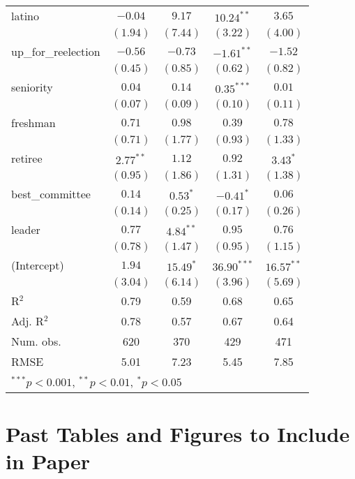 \documentclass[12pt]{article}
\begin{document}
\begin{table}
\begin{center}
\begin{tabular}{l c c c c }
			latino                 & $-0.04$       & $9.17$        & $10.24^{**}$   & $3.65$        \\
			& $(1.94)$      & $(7.44)$      & $(3.22)$       & $(4.00)$      \\
			up\_for\_reelection    & $-0.56$       & $-0.73$       & $-1.61^{**}$   & $-1.52$       \\
			& $(0.45)$      & $(0.85)$      & $(0.62)$       & $(0.82)$      \\
			seniority              & $0.04$        & $0.14$        & $0.35^{***}$   & $0.01$        \\
			& $(0.07)$      & $(0.09)$      & $(0.10)$       & $(0.11)$      \\
			freshman               & $0.71$        & $0.98$        & $0.39$         & $0.78$        \\
			& $(0.71)$      & $(1.77)$      & $(0.93)$       & $(1.33)$      \\
			retiree                & $2.77^{**}$   & $1.12$        & $0.92$         & $3.43^{*}$    \\
			& $(0.95)$      & $(1.86)$      & $(1.31)$       & $(1.38)$      \\
			best\_committee        & $0.14$        & $0.53^{*}$    & $-0.41^{*}$    & $0.06$        \\
			& $(0.14)$      & $(0.25)$      & $(0.17)$       & $(0.26)$      \\
			leader                 & $0.77$        & $4.84^{**}$   & $0.95$         & $0.76$        \\
			& $(0.78)$      & $(1.47)$      & $(0.95)$       & $(1.15)$      \\
			(Intercept)            & $1.94$        & $15.49^{*}$   & $36.90^{***}$  & $16.57^{**}$  \\
			& $(3.04)$      & $(6.14)$      & $(3.96)$       & $(5.69)$      \\
			\hline
			R$^2$                  & 0.79          & 0.59          & 0.68           & 0.65          \\
			Adj. R$^2$             & 0.78          & 0.57          & 0.67           & 0.64          \\
			Num. obs.              & 620           & 370           & 429            & 471           \\
			RMSE                   & 5.01          & 7.23          & 5.45           & 7.85          \\
			\hline
			\multicolumn{5}{l}{\scriptsize{$^{***}p<0.001$, $^{**}p<0.01$, $^*p<0.05$}}
		\end{tabular}
	\end{center}
\end{table}
	
\section{Past Tables and Figures to Include in Paper}
\end{document}
